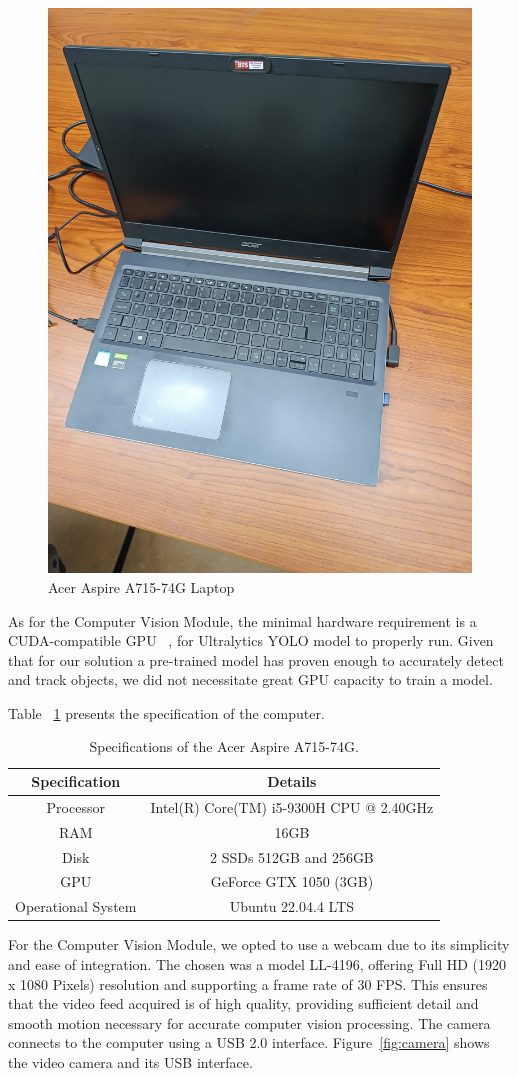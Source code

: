 \begin{figure}[H]
    \centering
    \includegraphics[width=0.3\linewidth]{figures/acer}
    \caption{Acer Aspire A715-74G Laptop}
    \label{fig:computer_acer}
\end{figure}

As for the Computer Vision Module, the minimal hardware requirement is a CUDA-compatible GPU ~\cite{ultralytics_faq}, for Ultralytics YOLO model to properly run.
Given that for our solution a pre-trained model has proven enough to accurately detect and track objects, we did not necessitate great GPU capacity to train a model.

Table ~\ref{tab:specs_pc} presents the specification of the computer.

\begin{table}[H]
    \caption{Specifications of the Acer Aspire A715-74G.}
    \label{tab:specs_pc}
    \begin{tabular}{|c|c|}
        \hline
        \textbf{Specification} & \textbf{Details} \\ \hline
        Processor                      &           Intel(R) Core(TM) i5-9300H CPU @ 2.40GHz   \\ \hline
        RAM                      &          16GB        \\ \hline
        Disk                      &   2 SSDs  512GB and 256GB         \\ \hline
        GPU                     &   GeForce GTX 1050 (3GB)      \\ \hline
        Operational System & Ubuntu 22.04.4 LTS                  \\ \hline
    \end{tabular}
\end{table}

For the Computer Vision Module, we opted to use a webcam due to its simplicity and ease of integration.
The chosen was a model LL-4196, offering Full HD (1920 x 1080 Pixels) resolution and supporting a frame rate of 30 FPS\@.
This ensures that the video feed acquired is of high quality, providing sufficient detail and smooth motion necessary for accurate computer vision processing.
The camera connects to the computer using a USB 2.0 interface.
Figure~\ref{fig:camera} shows the video camera and its USB interface.

